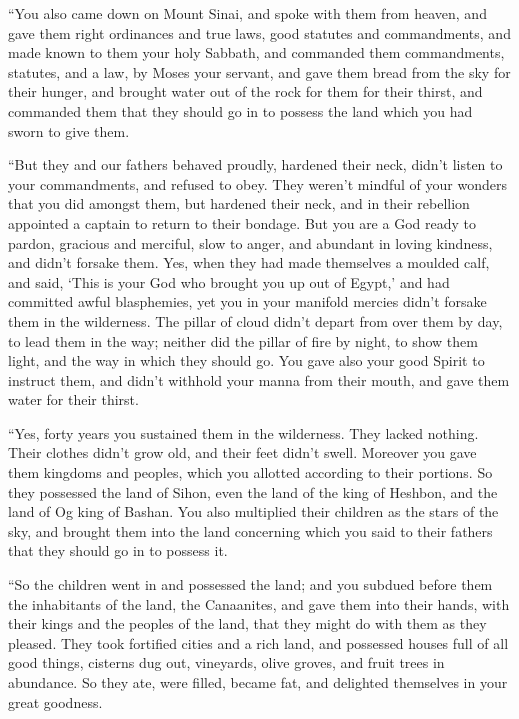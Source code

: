  ``You also came down on Mount Sinai, and spoke with them
from heaven, and gave them right ordinances and true laws, good statutes
and commandments,  and made known to them your holy
Sabbath, and commanded them commandments, statutes, and a law, by Moses
your servant,  and gave them bread from the sky for their
hunger, and brought water out of the rock for them for their thirst, and
commanded them that they should go in to possess the land which you had
sworn to give them.

 ``But they and our fathers behaved proudly, hardened
their neck, didn't listen to your commandments,  and
refused to obey. They weren't mindful of your wonders that you did
amongst them, but hardened their neck, and in their rebellion appointed
a captain to return to their bondage. But you are a God ready to pardon,
gracious and merciful, slow to anger, and abundant in loving kindness,
and didn't forsake them.  Yes, when they had made
themselves a moulded calf, and said, `This is your God who brought you
up out of Egypt,' and had committed awful blasphemies, 
yet you in your manifold mercies didn't forsake them in the wilderness.
The pillar of cloud didn't depart from over them by day, to lead them in
the way; neither did the pillar of fire by night, to show them light,
and the way in which they should go.  You gave also your
good Spirit to instruct them, and didn't withhold your manna from their
mouth, and gave them water for their thirst.

 ``Yes, forty years you sustained them in the wilderness.
They lacked nothing. Their clothes didn't grow old, and their feet
didn't swell.  Moreover you gave them kingdoms and
peoples, which you allotted according to their portions. So they
possessed the land of Sihon, even the land of the king of Heshbon, and
the land of Og king of Bashan.  You also multiplied their
children as the stars of the sky, and brought them into the land
concerning which you said to their fathers that they should go in to
possess it.

 ``So the children went in and possessed the land; and
you subdued before them the inhabitants of the land, the Canaanites, and
gave them into their hands, with their kings and the peoples of the
land, that they might do with them as they pleased.  They
took fortified cities and a rich land, and possessed houses full of all
good things, cisterns dug out, vineyards, olive groves, and fruit trees
in abundance. So they ate, were filled, became fat, and delighted
themselves in your great goodness.

